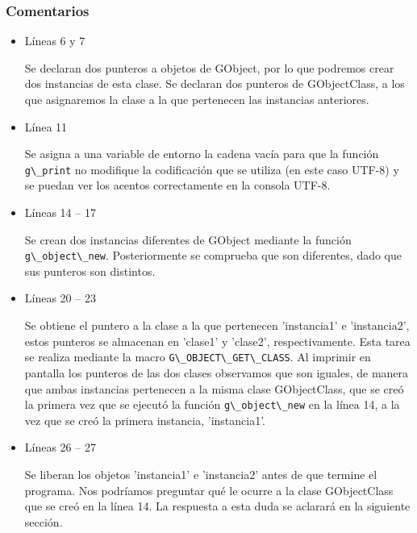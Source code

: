 \subsubsection{Comentarios}
\begin{itemize}
\item Líneas 6 y 7\par
  Se declaran dos punteros a objetos de \textsf{GObject}, por lo que podremos crear dos
  instancias de esta clase.
  Se declaran dos punteros de \textsf{GObjectClass}, a los que asignaremos la clase a la que pertenecen
  las instancias anteriores.
\item Línea 11\par
  Se asigna a una variable de entorno la cadena vacía para que la función
  \passthrough{\lstinline!g\_print!} no modifique la codificación que se utiliza (en este caso UTF-8)
  y se puedan ver los acentos correctamente en la consola UTF-8.
\item Líneas 14 -- 17\par
  Se crean dos instancias diferentes de \textsf{GObject} mediante la función 
  \passthrough{\lstinline!g\_object\_new!}. Posteriormente se comprueba que son diferentes, dado que
  sus punteros son distintos.
\item Líneas 20 -- 23\par
  Se obtiene el puntero a la clase a la que pertenecen 'instancia1' e 'instancia2', estos punteros se
  almacenan en 'clase1' y 'clase2', respectivamente. Esta tarea se realiza mediante la macro
  \passthrough{\lstinline!G\_OBJECT\_GET\_CLASS!}. Al imprimir en pantalla los punteros de las
  dos clases observamos que son iguales, de manera que ambas instancias pertenecen a la misma
  clase \textsf{GObjectClass}, que se creó la primera vez que se ejecutó la función
  \passthrough{\lstinline!g\_object\_new!} en la línea 14, a la vez que se creó la primera instancia,
  'instancia1'.
\item Líneas 26 -- 27\par
  Se liberan los objetos 'instancia1' e 'instancia2' antes de que termine el programa. Nos podríamos
  preguntar qué le ocurre a la clase \textsf{GObjectClass} que se creó en la línea 14. La respuesta a
  esta duda se aclarará en la siguiente sección.
  
\end{itemize}


